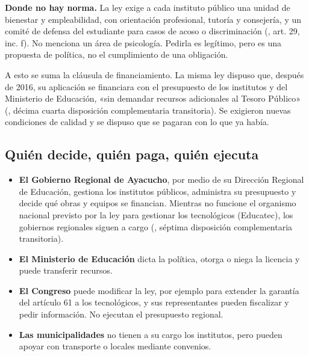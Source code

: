 \documentclass[
  jou,
  floatsintext,
  longtable,
  a4paper,
  nolmodern,
  notxfonts,
  notimes,
  12pt,
  colorlinks=true,linkcolor=blue,citecolor=blue,urlcolor=blue]{apa7}
\providecommand{\tightlist}{%
  \setlength{\itemsep}{0pt}\setlength{\parskip}{0pt}}
\begin{document}
\textbf{Donde no hay norma.} La ley exige a cada instituto público una
unidad de bienestar y empleabilidad, con orientación profesional,
tutoría y consejería, y un comité de defensa del estudiante para casos
de acoso o discriminación
(, art. 29, inc. f). No menciona un área de psicología. Pedirla es
legítimo, pero es una propuesta de política, no el cumplimiento de una
obligación.

A esto se suma la cláusula de financiamiento. La misma ley dispuso que,
después de 2016, su aplicación se financiara con el presupuesto de los
institutos y del Ministerio de Educación, «sin demandar recursos
adicionales al Tesoro Público»
(, décima cuarta disposición complementaria transitoria). Se
exigieron nuevas condiciones de calidad y se dispuso que se pagaran con
lo que ya había.

\subsection{Quién decide, quién paga, quién
ejecuta}\label{quiuxe9n-decide-quiuxe9n-paga-quiuxe9n-ejecuta}

\begin{itemize}
\tightlist
\item
  \textbf{El Gobierno Regional de Ayacucho}, por medio de su Dirección
  Regional de Educación, gestiona los institutos públicos, administra su
  presupuesto y decide qué obras y equipos se financian. Mientras no
  funcione el organismo nacional previsto por la ley para gestionar los
  tecnológicos (Educatec), los gobiernos regionales siguen a cargo
  (, séptima disposición complementaria transitoria).
\item
  \textbf{El Ministerio de Educación} dicta la política, otorga o niega
  la licencia y puede transferir recursos.
\item
  \textbf{El Congreso} puede modificar la ley, por ejemplo para extender
  la garantía del artículo 61 a los tecnológicos, y sus representantes
  pueden fiscalizar y pedir información. No ejecutan el presupuesto
  regional.
\item
  \textbf{Las municipalidades} no tienen a su cargo los institutos, pero
  pueden apoyar con transporte o locales mediante convenios.
\end{itemize}
\end{document}
